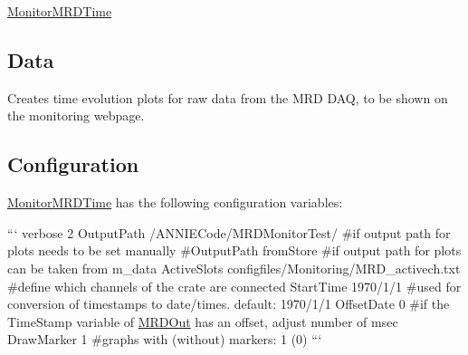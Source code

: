 \hyperlink{classMonitorMRDTime}{Monitor\-M\-R\-D\-Time}

\subsection*{Data}

Creates time evolution plots for raw data from the M\-R\-D D\-A\-Q, to be shown on the monitoring webpage.

\subsection*{Configuration}

\hyperlink{classMonitorMRDTime}{Monitor\-M\-R\-D\-Time} has the following configuration variables\-:

``` verbose 2 Output\-Path /\-A\-N\-N\-I\-E\-Code/\-M\-R\-D\-Monitor\-Test/ \#if output path for plots needs to be set manually \#\-Output\-Path from\-Store \#if output path for plots can be taken from m\-\_\-data Active\-Slots configfiles/\-Monitoring/\-M\-R\-D\-\_\-activech.\-txt \#define which channels of the crate are connected Start\-Time 1970/1/1 \#used for conversion of timestamps to date/times. default\-: 1970/1/1 Offset\-Date 0 \#if the Time\-Stamp variable of \hyperlink{classMRDOut}{M\-R\-D\-Out} has an offset, adjust number of msec Draw\-Marker 1 \#graphs with (without) markers\-: 1 (0) ``` 